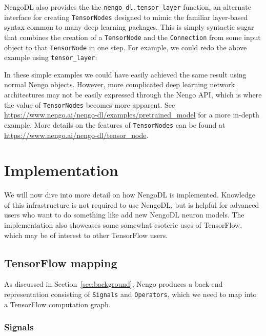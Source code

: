 \documentclass{article}
\begin{document}
NengoDL also provides the the \texttt{nengo\_dl.tensor\_layer} function, an alternate interface for creating \texttt{TensorNodes} designed to mimic the familiar layer-based syntax common to many deep learning packages.  This is simply syntactic sugar that combines the creation of a \texttt{TensorNode} and the \texttt{Connection} from some input object to that \texttt{TensorNode} in one step.  For example, we could redo the above example using \texttt{tensor\_layer}:



In these simple examples we could have easily achieved the same result using normal Nengo objects.  However, more complicated deep learning network architectures may not be easily expressed through the Nengo API, which is where the value of \texttt{TensorNodes} becomes more apparent.  See \url{https://www.nengo.ai/nengo-dl/examples/pretrained_model} for a more in-depth example.  More details on the features of \texttt{TensorNodes} can be found at \url{https://www.nengo.ai/nengo-dl/tensor_node}.

\section{Implementation}
\label{sec:implementation}

We will now dive into more detail on how NengoDL is implemented.  Knowledge of this infrastructure is not required to use NengoDL, but is helpful for advanced users who want to do something like add new NengoDL neuron models.  The implementation also showcases some somewhat esoteric uses of TensorFlow, which may be of interest to other TensorFlow users.

\subsection{TensorFlow mapping}

As discussed in Section~\ref{sec:background}, Nengo produces a back-end representation consisting of \texttt{Signals} and \texttt{Operators}, which we need to map into a TensorFlow computation graph.

\subsubsection{Signals}
\end{document}
